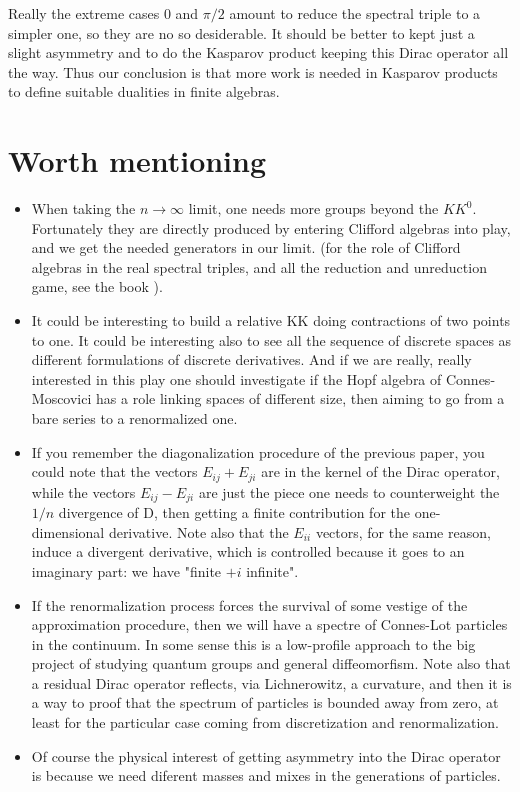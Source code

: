 \documentclass[a4paper,10pt]{article}
\begin{document}
Really the extreme cases $0$ and $\pi/2$ amount to reduce the spectral
triple to a simpler one, so they are no so desiderable. It should be better
to kept just a slight asymmetry and to do the Kasparov product keeping
this Dirac operator all the way. Thus our conclusion is that more work
is needed in Kasparov products to define suitable dualities in 
finite algebras.

\section{Worth mentioning}

\begin{itemize}
\item
When taking the $n\to\infty$ limit, one needs more groups beyond the
$KK^0$. Fortunately they are directly produced by entering Clifford
algebras into play, and we get the needed generators in our limit.
(for the role of Clifford algebras in the real spectral triples, and all
the reduction and unreduction game, see the book \cite{FGV}).

\item
It could be interesting to build a relative KK doing contractions of two
points to one. It could be interesting also to see all the sequence of
discrete spaces as different formulations of discrete derivatives. And if
we are really, really interested in this play one should investigate if
the Hopf algebra of Connes-Moscovici has a role linking spaces of
different size, then aiming to go from a bare series to a renormalized one.

\item
If you remember the diagonalization procedure of the previous paper,
you could note that the vectors $E_{ij}+E_{ji}$ are in the kernel of the
Dirac operator, while
the vectors $E_{ij}-E_{ji}$ are just the piece one needs to counterweight the
$1/n$ divergence of D, then getting a finite contribution
for the one-dimensional derivative. Note also that the $E_{ii}$ vectors, for
the same reason, induce a divergent derivative, which is controlled because it
goes to an imaginary part: we have  "finite $+ i$ infinite".

\item
If the renormalization process forces the survival of some vestige of the
approximation procedure, then we will have a spectre of Connes-Lot particles
in the continuum. In some  sense this is a low-profile approach to the big 
project of studying quantum groups and general diffeomorfism. Note also
that a residual Dirac operator reflects, via Lichnerowitz, a curvature, and
then it is a way to proof that the spectrum of particles is bounded away
from zero, at least for the particular case coming from discretization
and renormalization. 

\item Of course the physical interest of getting asymmetry into the
Dirac operator is because we need diferent masses and mixes in the
generations of particles.

\end{itemize}
 
\end{document}
